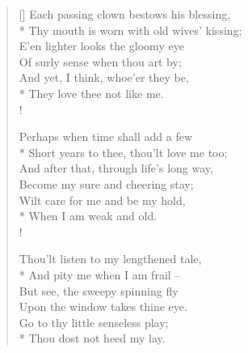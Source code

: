 \documentclass[MAIN]{subfiles}
\begin{document}
\begin{verse}[\versewidth]
Each passing clown bestows his blessing,\\*
Thy mouth is worn with old wives' kissing;\\
E'en lighter looks the gloomy eye\\
Of surly sense when thou art by;\\
And yet, I think, whoe'er they be,\\*
\vin They love thee not like me.\\!

Perhaps when time shall add a few\\*
Short years to thee, thou'lt love me too;\\
And after that, through life’s long way,\\
Become my sure and cheering stay;\\
Wilt care for me and be my hold,\\*
\vin When I am weak and old.\\!

Thou'lt listen to my lengthened tale,\\*
And pity me when I am frail --\\
But see, the sweepy spinning fly\\
Upon the window takes thine eye.\\
Go to thy little senseless play;\\*
\vin Thou dost not heed my lay.
\end{verse}
\end{document}
